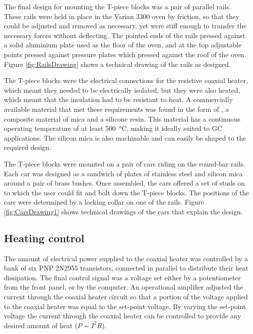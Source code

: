 The final design for mounting the T-piece blocks was a pair of parallel rails.
These rails were held in place in the Varian 3300 oven by friction, so that they
could be adjusted and removed as necessary, yet were stiff enough to transfer
the necessary forces without deflecting. The pointed ends of the rails pressed
against a solid aluminium plate used as the floor of the oven, and at the top
adjustable points pressed against pressure plates which pressed against the roof
of the oven. Figure \ref{fig:RailsDrawing} shows a technical drawing of the
rails as designed.

The T-piece blocks were the electrical connections for the resistive coaxial
heater, which meant they needed to be electrically isolated, but they were also
heated, which meant that the insulation had to be resistant to heat. A
commercially available material that met these requirements was found in the
form of , a composite material of mica and a silicone
resin. This material has a continuous operating temperature of at least
\SI{500}{\celsius}, making it ideally suited to GC applications. The silicon
mica is also machinable and can easily be shaped to the required design. 

The T-piece blocks were mounted on a pair of cars riding on the round-bar rails.
Each car was designed as a sandwich of plates of stainless steel and silicon
mica around a pair of brass bushes. Once assembled, the cars offered a set of
studs on to which the user could fit and bolt down the T-piece blocks. The
positions of the cars were determined by a locking collar on one of the rails.
Figure \ref{fig:CarsDrawing1} shows technical drawings of the cars that explain
the design.


\subsection{Heating control}

The amount of electrical power supplied to the coaxial heater was controlled by
a bank of six PNP 2N2955 transistors, connected in parallel to distribute their
heat dissipation. The final control signal was a voltage set either by a
potentiometer from the front panel, or by the computer. An operational amplifier
adjusted the current through the coaxial heater circuit so that a portion of the
voltage applied to the coaxial heater was equal to the set-point voltage. By
varying the set-point voltage the current through the coaxial heater can be
controlled to provide any desired amount of heat (\(P = I^2R\)).

